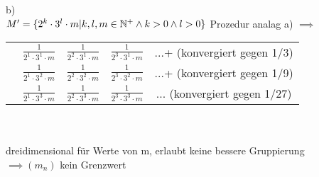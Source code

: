 b)\\
\(M' = \{2^k \cdot  3^l \cdot  m | k,l,m \in \mathbb{N}^+\land k > 0 \land l > 0\}\\\)
Prozedur analag a) \(\implies\) \\
\begin{tabular}{cc@{+}c@{+}c@{+}c}  \\
 &\(\frac{1}{2^1\cdot 3^1\cdot  m}\)&\(\frac{1}{2^2\cdot 3^1\cdot m}\)&\(\frac{1}{2^3\cdot 3^1\cdot m}\)&...+
\small(konvergiert gegen 1/3)\\
&\(\frac{1}{2^1\cdot 3^2\cdot m}\)&\(\frac{1}{2^2\cdot 3^2\cdot m}\)&\(\frac{1}{2^3\cdot 3^2\cdot m}\)&...+
\small(konvergiert gegen 1/9)\\
&\(\frac{1}{2^1\cdot 3^3\cdot m}\)&\(\frac{1}{2^2\cdot 3^3\cdot m}\)&\(\frac{1}{2^3\cdot 3^3\cdot m}\)&...
\small(konvergiert gegen 1/27)
\end{tabular} \\ \\dreidimensional für Werte von m, erlaubt keine bessere Gruppierung \\
\(\implies (m_n) \) kein Grenzwert
\\

